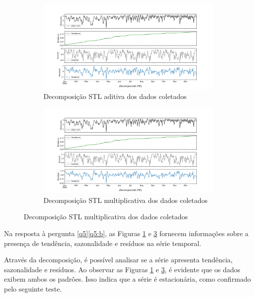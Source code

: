 \begin{figure}[!htpb]
	\centering
	\caption{Decomposição STL}
	\begin{subfigure}{1\textwidth}
		\includegraphics[width=\linewidth]{"Resultados/Figuras/STL aditiva"}
		\caption{Decomposição STL aditiva dos dados coletados}
		\label{fig:stl-aditiva}
	\end{subfigure}
		
	\begin{subfigure}{1\textwidth}
		\includegraphics[width=\linewidth]{Resultados/Figuras/STL}
		\caption{Decomposição STL multiplicativa dos dados coletados}
		\label{fig:stl}
	\end{subfigure}
	
\end{figure}

Na resposta à pergunta \ref{q5}\ref{q5:b}, as Figuras \ref{fig:stl-aditiva} e \ref{fig:stl} fornecem informações sobre a presença de tendência, sazonalidade e resíduos na série temporal.

Através da decomposição, é possível analisar se a série apresenta tendência, sazonalidade e resíduos. Ao observar as Figuras \ref{fig:stl-aditiva} e \ref{fig:stl}, é evidente que os dados exibem ambos os padrões. Isso indica que a série é estacionária, como confirmado pelo seguinte teste.

